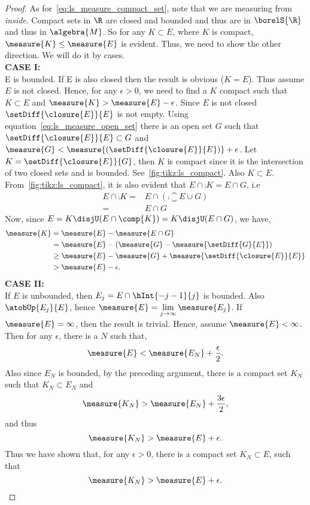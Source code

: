 \begin{proof}
     As for~\ref{eq:ls_measure_compact_set}, note that we are measuring from \emph{inside}. Compact
     sets in $\R$ are closed and bounded and thus are in $\borelS{\R}$ and thus in $\algebra{M}$. So
     for any $K \subset E$, where $K$ is compact, $\measure{K} \leq \measure{E}$ is evident. Thus,
     we need to show the other direction. We will do it by cases.\\ 
     \textbf{CASE I:} \\
     E is bounded. If E is also closed then the result is obvious ($K = E$). Thus assume $E$ is not
     closed. Hence, for any $\epsilon > 0$, we need to find a $K$ compact such that 
     $K \subset E$ and $\measure{K} > \measure{E} - \epsilon$. Since $E$ is not closed
     $\setDiff{\closure{E}}{E}$ is not empty. Using equation~\ref{eq:ls_measure_open_set} there is
     an open set $G$ such that $\setDiff{\closure{E}}{E} \subset G$ and 
     $\measure{G} < \measure{(\setDiff{\closure{E}}{E})}+ \epsilon$. Let $K =
     \setDiff{\closure{E}}{G}$, then $K$ is compact since it is the intersection of two closed sets and
     is bounded. See~\ref{fig:tikz:ls_compact}. Also $K \subset E$. From~\ref{fig:tikz:ls_compact},
     it is also evident that $E\cap\comp{K} = E\cap{G}$, i.e
     \begin{align*} 
	 E\cap\comp{K} =& E \cap ( \comp{\closure{E}} \cup G) \\
	 =& E \cap G
     \end{align*}
     Now, since $E = K \disjU (E\cap\comp{K}) = K \disjU (E \cap G)$, we have,
     \begin{align*}
	 \measure{K} &= \measure{E} - \measure{E\cap G} \\
	 &= \measure{E} - (\measure{G} - \measure{\setDiff{G}{E}}) \\ 
	 &\geq \measure{E} - \measure{G} + \measure{\setDiff{\closure{E}}{E}} \\
	 &> \measure{E} - \epsilon.
     \end{align*}
     \textbf{CASE II:}\\
     If $E$ is unbounded, then $E_j = E\cap\hInt{-j-1}{j}$ is bounded. Also $\atobUp{E_j}{E}$, hence
     $\measure{E} = \lim\limits_{j\to\infty}{\measure{E_j}}$. If $\measure{E} = \infty$, then the
     result is trivial. Hence, assume $\measure{E} < \infty$. Then for any $\epsilon$, there is a
     $N$ such that,
     \[\measure{E} < \measure{E_N} + \frac{\epsilon}{2}.\]
     Also since $E_N$ is bounded, by the preceding argument, there is a compact set $K_N$ such that
     $K_N \subset E_N$ and 
     \[\measure{K_N} > \measure{E_N} + \frac{3\epsilon}{2},\] and thus
     \[\measure{K_N} > \measure{E} + \epsilon.\]
     Thus we have shown that, for any $\epsilon > 0$, there is a compact set $K_N \subset E$, 
     such that 
     \[\measure{K_N} > \measure{E} + \epsilon.\]
\end{proof}

